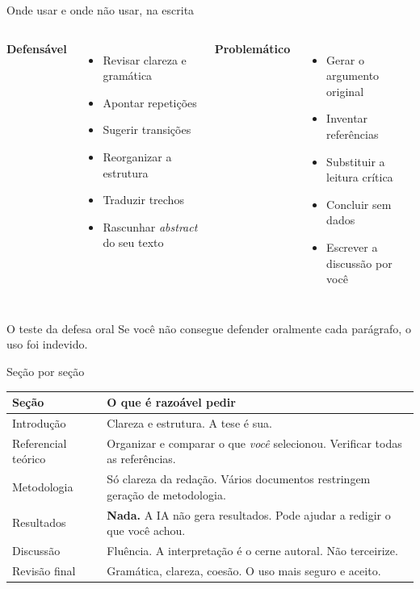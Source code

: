 \documentclass[11pt,aspectratio=169,t]{beamer}
\begin{document}
\begin{frame}{Onde usar e onde não usar, na escrita}
  \begin{columns}[t]
    \textbf{\color{verdeCodigo}Defensável}
    \begin{itemize}
      \item Revisar clareza e gramática
      \item Apontar repetições
      \item Sugerir transições
      \item Reorganizar a estrutura
      \item Traduzir trechos
      \item Rascunhar \textit{abstract} do seu texto
    \end{itemize}
    \textbf{\color{laranjaDestaque}Problemático}
    \begin{itemize}
      \item Gerar o argumento original
      \item Inventar referências
      \item Substituir a leitura crítica
      \item Concluir sem dados
      \item Escrever a discussão por você
    \end{itemize}
  \end{columns}
  \pause
  \vfill
  \begin{alertblock}{O teste da defesa oral}
    \centering Se você não consegue defender oralmente cada parágrafo, o uso foi indevido.
  \end{alertblock}
\end{frame}

\begin{frame}{Seção por seção}
  \small
  \begin{tabular}{p{3.2cm} p{10.5cm}}
    \toprule
    \textbf{Seção} & \textbf{O que é razoável pedir} \\
    \midrule
    Introdução & Clareza e estrutura. \alert{A tese é sua.} \\
    Referencial teórico & Organizar e comparar o que \textit{você} selecionou. Verificar todas as referências. \\
    Metodologia & Só clareza da redação. \alert{Vários documentos restringem geração de metodologia.} \\
    Resultados & \textbf{Nada.} A IA não gera resultados. Pode ajudar a redigir o que você achou. \\
    Discussão & Fluência. \alert{A interpretação é o cerne autoral. Não terceirize.} \\
    Revisão final & Gramática, clareza, coesão. O uso mais seguro e aceito. \\
    \bottomrule
  \end{tabular}
\end{frame}
\end{document}
